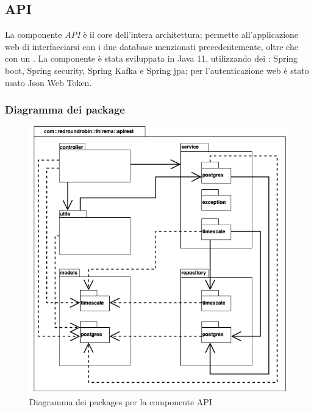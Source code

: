 \subsection{API}
	La componente \textit{API} è il core dell'intera architettura; permette all'applicazione web di interfacciarsi con i due database menzionati precedentemente, oltre che con un .
	\newline
	La componente è stata sviluppata in Java 11, utilizzando dei : Spring boot, Spring security, Spring Kafka e Spring jpa; per l'autenticazione web è stato usato Json Web Token.

	\subsubsection{Diagramma dei package}%
		\begin{figure}[H]
			\centering
			\includegraphics[scale=0.500]{res/images/API/packageAPI.png}
			\caption{Diagramma dei packages per la componente API}
			\label{Diagramma 10}
		\end{figure}

